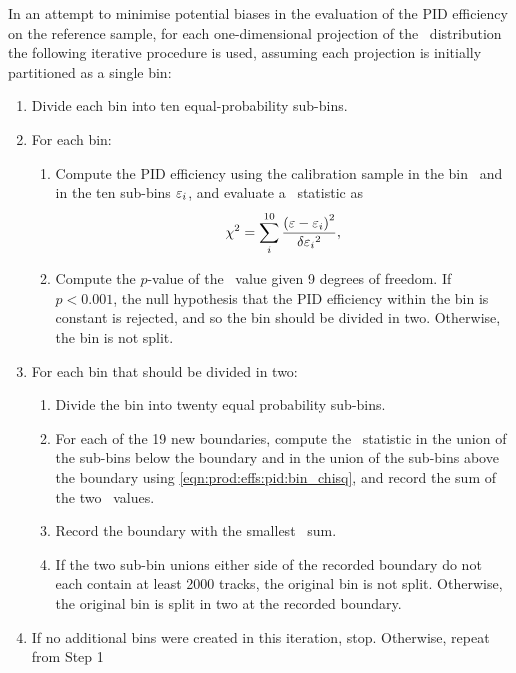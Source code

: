 In an attempt to minimise potential biases in the evaluation of the \ac{PID}
efficiency on the reference sample, for each one-dimensional projection of the
\ptotetanspd\ distribution the following iterative procedure is used, assuming
each projection is initially partitioned as a single bin:
\begin{enumerate}
  \item Divide each bin into ten equal-probability sub-bins.
  \item For each bin:
    \begin{enumerate}
      \item Compute the \ac{PID} efficiency using the calibration sample in the
        bin \eff\ and in the ten sub-bins $\varepsilon_{i}$, and evaluate a \chisq\
        statistic as
        \begin{equation}
          \chi^2 = \sum_{i}^{10} \frac{{(\varepsilon - \varepsilon_{i})}^{2}}{\delta{\ensuremath{\varepsilon}_{i}}^{2}},
          \label{eqn:prod:effs:pid:bin_chisq}
        \end{equation}
      \item Compute the $p$-value of the \chisq\ value given 9 degrees of
        freedom. If $p < 0.001$, the null hypothesis that the \ac{PID}
        efficiency within the bin is constant is rejected, and so the bin
        should be divided in two. Otherwise, the bin is not split.
    \end{enumerate}
  \item For each bin that should be divided in two:
    \begin{enumerate}
      \item Divide the bin into twenty equal probability sub-bins.
      \item For each of the 19 new boundaries, compute the \chisq\ statistic in
        the union of the sub-bins below the boundary and in the union of the
        sub-bins above the boundary using \cref{eqn:prod:effs:pid:bin_chisq},
        and record the sum of the two \chisq\ values.
      \item Record the boundary with the smallest \chisq\ sum.
      \item If the two sub-bin unions either side of the recorded boundary do
        not each contain at least 2000 tracks, the original bin is not split.
        Otherwise, the original bin is split in two at the recorded boundary.
    \end{enumerate}
  \item If no additional bins were created in this iteration, stop.  Otherwise,
    repeat from Step 1
\end{enumerate}
